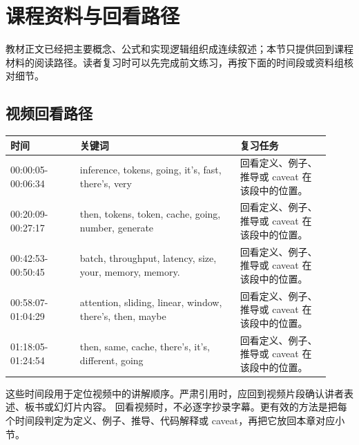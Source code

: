 \documentclass[a4paper]{article}
\begin{document}
\section{课程资料与回看路径}
教材正文已经把主要概念、公式和实现逻辑组织成连续叙述；本节只提供回到课程材料的阅读路径。读者复习时可以先完成前文练习，再按下面的时间段或资料组核对细节。
\subsection{视频回看路径}
\begin{longtable}{p{0.20\linewidth}p{0.46\linewidth}p{0.26\linewidth}}
\toprule
\textbf{时间} & \textbf{关键词} & \textbf{复习任务}\\
\midrule
00:00:05-00:06:34 & inference, tokens, going, it's, fast, there's, very & 回看定义、例子、推导或 caveat 在该段中的位置。\\
00:20:09-00:27:17 & then, tokens, token, cache, going, number, generate & 回看定义、例子、推导或 caveat 在该段中的位置。\\
00:42:53-00:50:45 & batch, throughput, latency, size, your, memory, memory. & 回看定义、例子、推导或 caveat 在该段中的位置。\\
00:58:07-01:04:29 & attention, sliding, linear, window, there's, then, maybe & 回看定义、例子、推导或 caveat 在该段中的位置。\\
01:18:05-01:24:54 & then, same, cache, there's, it's, different, going & 回看定义、例子、推导或 caveat 在该段中的位置。\\
\bottomrule
\end{longtable}
这些时间段用于定位视频中的讲解顺序。严肃引用时，应回到视频片段确认讲者表述、板书或幻灯片内容。
回看视频时，不必逐字抄录字幕。更有效的方法是把每个时间段判定为定义、例子、推导、代码解释或 caveat，再把它放回本章对应小节。
\end{document}
